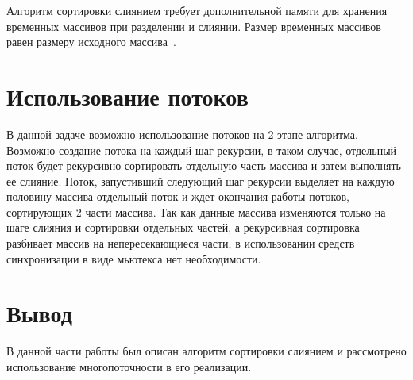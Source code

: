 Алгоритм сортировки слиянием требует дополнительной памяти для хранения временных массивов при разделении и слиянии. Размер временных массивов равен размеру исходного массива~\cite{merge-sort}.


\section{Использование потоков}
В данной задаче возможно использование потоков на 2 этапе алгоритма. Возможно создание  потока на каждый шаг рекурсии, в таком случае, 
отдельный поток будет рекурсивно сортировать отдельную часть массива  и затем выполнять ее слияние. Поток, запустивший следующий шаг рекурсии 
выделяет на каждую половину массива отдельный поток и ждет окончания работы потоков, сортирующих 2 части массива. Так как данные массива изменяются только на шаге слияния и сортировки отдельных частей, а рекурсивная сортировка
разбивает массив на непересекающиеся части, в использовании средств синхронизации в виде мьютекса нет необходимости.

\section*{Вывод}
В данной части работы был описан алгоритм сортировки слиянием и рассмотрено использование многопоточности в его реализации.






